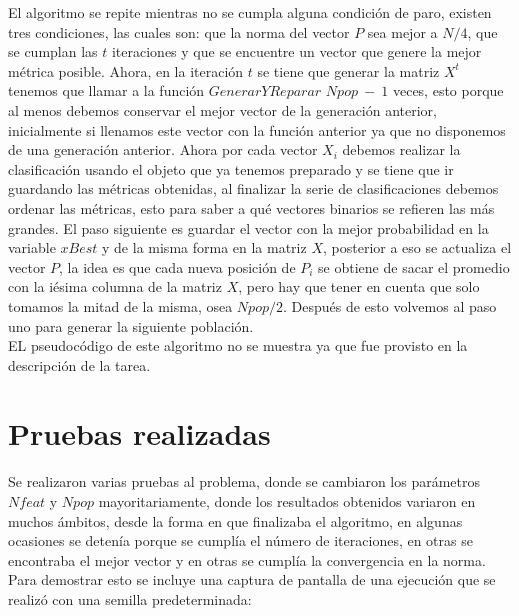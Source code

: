 \documentclass[12pt]{article}
\begin{document}
El algoritmo se repite mientras no se cumpla alguna condición de paro, existen tres condiciones, las cuales son: que la norma del vector $P$ sea mejor a $N/4$, que se cumplan las $t$ iteraciones y que se encuentre un vector que genere la mejor métrica posible. Ahora, en la iteración $t$ se tiene que generar la matriz $X^t$ tenemos que llamar a la función $GenerarYReparar$ $Npop\ -\ 1$ veces, esto porque al menos debemos conservar el mejor vector de la generación anterior, inicialmente si llenamos este vector con la función anterior ya que no disponemos de una generación anterior. Ahora por cada vector $X_i$ debemos realizar la clasificación usando el objeto que ya tenemos preparado y se tiene que ir guardando las métricas obtenidas, al finalizar la serie de clasificaciones debemos ordenar las métricas, esto para saber a qué vectores binarios se refieren las más grandes. El paso siguiente es guardar el vector con la mejor probabilidad en la variable $xBest$ y de la misma forma en la matriz $X$, posterior a eso se actualiza el vector $P$, la idea es que cada nueva posición de $P_i$ se obtiene de sacar el promedio con la iésima columna de la matriz $X$, pero hay que tener en cuenta que solo tomamos la mitad de la misma, osea $Npop/2$. Después de esto volvemos al paso uno para generar la siguiente población.\\
EL pseudocódigo de este algoritmo no se muestra ya que fue provisto en la descripción de la tarea.

\section{Pruebas realizadas}
Se realizaron varias pruebas al problema, donde se cambiaron los parámetros $Nfeat$ y $Npop$ mayoritariamente, donde los resultados obtenidos variaron en muchos ámbitos, desde la forma en que finalizaba el algoritmo, en algunas ocasiones se detenía porque se cumplía el número de iteraciones, en otras se encontraba el mejor vector y en otras se cumplía la convergencia en la norma. Para demostrar esto se incluye una captura de pantalla de una ejecución que se realizó con una semilla predeterminada:\\

\begin{figure}[H]
	\centering
	\hfill
\end{figure}
\end{document}
